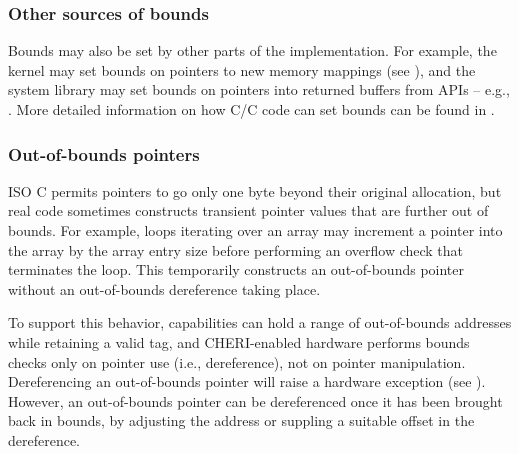 \documentclass[12pt,twoside,openright,usletter]{article}
\newcommand{\ccode}[1]{{\small\ttfamily{#1}}}
\newcommand{\cfunc}[1]{{\ccode{#1()}}}
\newcommand{\note}[2]{{\color{blue}[ Note: #1 - #2]}}
\renewcommand{\note}[2]{\relax\ifhmode\unskip\fi}
\newcommand{\psnote}[1]{\note{#1}{Peter S.}}
\newcommand*{\cpp}[1][]{C\textsmaller[2]{\nolinebreak[4]\hspace{-.05em}\raisebox{.45ex}{\textbf{++}}}}
\begin{document}
\psnote{that seems excessively bold to me}
\psnote{what flag?}
\psnote{curious: what has to change before you think it'd be a good default?}


\subsubsection{Other sources of bounds}

Bounds may also be set by other parts of the implementation.
For example, the kernel may set bounds on pointers to new memory mappings (see
), and the system library may set bounds on pointers
into returned buffers from APIs -- e.g., \cfunc{fgetln}.
More detailed information on how C/\cpp{} code can set bounds can be found in
.

\subsubsection{Out-of-bounds pointers}
\label{sec:oob}

\note{I feel like this section wants a reference to CHERI Concentrate?}{nwf}

ISO C permits pointers to go only one byte beyond their original
allocation, but real code sometimes constructs transient pointer
values that are further out of bounds.
For example, \ccode{for} loops iterating over an array may increment a pointer
into the array by the array entry size before performing an overflow check
that terminates the loop.
This temporarily constructs an out-of-bounds pointer without an out-of-bounds
dereference taking place.

To support this behavior, capabilities
can hold a range of out-of-bounds addresses while retaining a valid
tag, and CHERI-enabled hardware performs bounds checks only on pointer
use (i.e., dereference), not on pointer manipulation.  Dereferencing
an out-of-bounds pointer will raise a hardware exception (see
).  However, an out-of-bounds pointer can be
dereferenced once it has been brought back in bounds, by adjusting the
address or suppling a suitable offset in the dereference.
\end{document}
